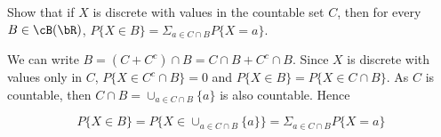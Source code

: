 \begin{exercise}
  Show that if $X$ is discrete with values in the countable set $C$, then for every $B\in\cB(\bR)$, $P\{X\in B\}=\Sigma_{a\in C\cap B}P\{X=a\}$.
\end{exercise}
\begin{solution}
  We can write $B=(C+C^c)\cap B=C\cap B+C^c\cap B$. Since $X$ is discrete with values only in $C$, $P\{X\in C^c\cap B\}=0$ and $P\{X\in B\} = P\{X\in C\cap B\}$. As $C$ is countable, then $C\cap B = \cup_{a\in C\cap B}\{a\}$ is also countable. Hence

  \[ P\{X\in B\} = P\{X\in\cup_{a\in C\cap B}\{a\}\} = \Sigma_{a\in C\cap B}P\{X=a\} \]
\end{solution}

